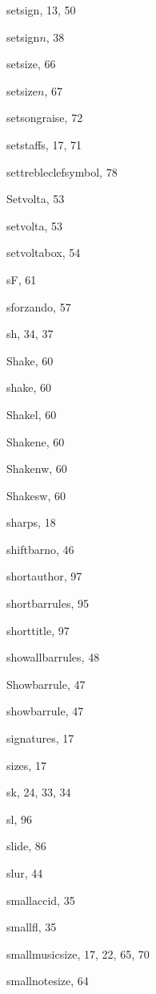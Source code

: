 \begin{theindex}
  \item {\Bslash setsign}, 13, 50
  \item {\Bslash setsign$n$}, 38
  \item {\Bslash setsize}, 66
  \item {\Bslash setsize$n$}, 67
  \item {\Bslash setsongraise}, 72
  \item {\Bslash setstaffs}, 17, 71
  \item {\Bslash settrebleclefsymbol}, 78
  \item {\Bslash Setvolta}, 53
  \item {\Bslash setvolta}, 53
  \item {\Bslash setvoltabox}, 54
  \item {\Bslash sF}, 61
  \item sforzando, 57
  \item {\Bslash sh}, 34, 37
  \item {\Bslash Shake}, 60
  \item {\Bslash shake}, 60
  \item {\Bslash Shakel}, 60
  \item {\Bslash Shakene}, 60
  \item {\Bslash Shakenw}, 60
  \item {\Bslash Shakesw}, 60
  \item sharps, 18
  \item {\Bslash shiftbarno}, 46
  \item {\Bslash shortauthor}, 97
  \item {\Bslash shortbarrules}, 95
  \item {\Bslash shorttitle}, 97
  \item {\Bslash showallbarrules}, 48
  \item {\Bslash Showbarrule}, 47
  \item {\Bslash showbarrule}, 47
  \item signatures, 17
  \item sizes, 17
  \item {\Bslash sk}, 24, 33, 34
  \item {\Bslash sl}, 96
  \item {\Bslash slide}, 86
  \item {\Bslash slur}, 44
  \item {\Bslash smallaccid}, 35
  \item {\Bslash smallfl}, 35
  \item {\Bslash smallmusicsize}, 17, 22, 65, 70
  \item {\Bslash smallnotesize}, 64

\end{theindex}
